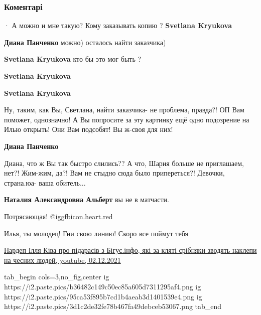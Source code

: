  
 
 
 
 
\subsubsection{Коментарі}

\begin{itemize} %
  · 
А можно и мне такую?
Кому заказывать копию ?
\textbf{Svetlana Kryukova}

\begin{itemize} %
\textbf{Диана Панченко} можно) осталось найти заказчика)

\textbf{Svetlana Kryukova} кто бы это мог быть ?

\textbf{Svetlana Kryukova}

\textbf{Svetlana Kryukova}

Ну, таким, как Вы, Светлана, найти заказчика- не проблема, правда?! ОП Вам
поможет, однозначно! А Вы попросите за эту картинку ещё одно подозрение на Илью
открыть! Они Вам подсобят! Вы ж-своя для них!

\textbf{Диана Панченко}

Диана, что ж Вы так быстро слились?? А что, Шария больше не приглашаем, нет?!
Жим-жим, да?! Вам не стыдно сюда было припереться?! Девочки, страна.юа- ваша
обитель...

\textbf{Наталия Александровна Альберт} вы не в матчасти.

\end{itemize} %

Потрясающая! @igg{fbicon.heart.red}

Илья, ты молодец! Гни свою линию! Скоро все поймут тебя

\href{https://youtu.be/ZA6ohXs7u4M}{%
Нардеп Ілля Ківа про підарасів з Бігус.інфо, які за кляті срібняки зводять наклепи на чесних людей, %
youtube, 02.12.2021%
}

\ifcmt
tab_begin cols=3,no_fig,center
  ig https://i2.paste.pics/b36482c149c50ec85a605d7311295af4.png
	ig https://i2.paste.pics/95ca53f895b7cd1b4aeab3d1401539e4.png
	ig https://i2.paste.pics/3d1c2de32fe78b467fa49debceb53067.png
tab_end
\fi


\end{itemize}
